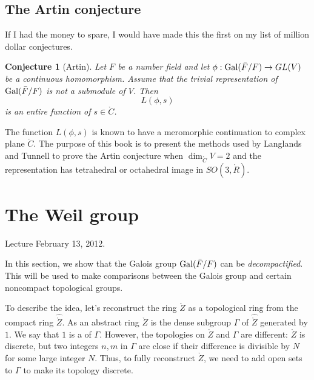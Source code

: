 \documentclass{amsart}
\newtheorem{conjecture}[equation]{Conjecture}
\def\CC{\ring{C}}
\def\RR{\ring{R}}
\def\oG{\op{Gal}}
\begin{document}
\subsection{The Artin conjecture}

If I had the money to spare, I would have made this the first on my
list of million dollar conjectures.

\begin{conjecture}[Artin] Let $F$ be a number field and let
  $\phi:\oG(\bar F/F)\to GL(V)$ be a continuous homomorphism.
  Assume that the trivial representation of $\oG(\bar F/F)$ is
  not a submodule of $V$.  Then
\[
L(\phi,s)
\]
is an entire function of $s\in \CC$.
\end{conjecture}

The function $L(\phi,s)$ is known to have a meromorphic continuation
to complex plane $\CC$.  The purpose of this book is to
present the methods used by Langlands and Tunnell to prove the Artin
conjecture when $\dim_{\CC}V = 2$ and the representation has
tetrahedral or octahedral image in $SO(3,\RR)$.

\newpage

\section{The Weil group}

Lecture February 13, 2012.

In this section, we show that the Galois group $\oG(\bar F/F)$ can
be {\it decompactified}.  This will be used to make comparisons between
the Galois group and certain noncompact topological groups.  

To describe
the idea, let's reconstruct the ring $\ring{Z}$ as a topological ring
from the compact ring $\hat{\ring{Z}}$.  As an abstract ring $\ring{Z}$
is the dense subgroup $\Gamma$ of $\hat{\ring{Z}}$ generated by
$1$.  We say that $1$ is a  of $\Gamma$.
However, the topologies on $\ring{Z}$ and $\Gamma$ are different:
$\ring{Z}$ is discrete, but two integers $n,m$ in $\Gamma$ are close
if their difference is divisible by $N$ for some large integer $N$.
Thus, to fully reconstruct $\ring{Z}$, we need to add open sets to $\Gamma$
to make its topology discrete.
\end{document}
